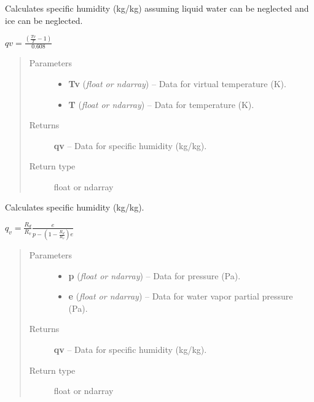 \documentclass[letterpaper,10pt,english]{sphinxmanual}
\begin{document}

\begin{fulllineitems}
\label{atmos:atmos.equations.qv_from_Tv_T}
Calculates specific humidity (kg/kg) assuming liquid water can be neglected and
ice can be neglected.

\(qv = \frac{(\frac{Tv}{T} - 1)}{0.608}\)
\begin{quote}\begin{description}
\item[{Parameters}] \leavevmode\begin{itemize}
\item {} 
\textbf{Tv} (\emph{float or ndarray}) -- Data for virtual temperature (K).

\item {} 
\textbf{T} (\emph{float or ndarray}) -- Data for temperature (K).

\end{itemize}

\item[{Returns}] \leavevmode
\textbf{qv} --
Data for specific humidity (kg/kg).

\item[{Return type}] \leavevmode
float or ndarray

\end{description}\end{quote}

\end{fulllineitems}


\begin{fulllineitems}
\label{atmos:atmos.equations.qv_from_p_e}
Calculates specific humidity (kg/kg).

\(q_v = \frac{R_d}{R_v} \frac{e}{p-(1-\frac{R_d}{R_v}) e}\)
\begin{quote}\begin{description}
\item[{Parameters}] \leavevmode\begin{itemize}
\item {} 
\textbf{p} (\emph{float or ndarray}) -- Data for pressure (Pa).

\item {} 
\textbf{e} (\emph{float or ndarray}) -- Data for water vapor partial pressure (Pa).

\end{itemize}

\item[{Returns}] \leavevmode
\textbf{qv} --
Data for specific humidity (kg/kg).

\item[{Return type}] \leavevmode
float or ndarray

\end{description}\end{quote}

\end{fulllineitems}
\end{document}
